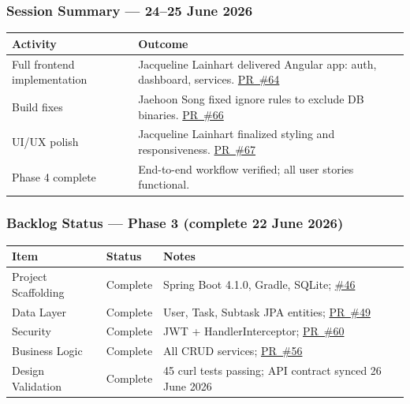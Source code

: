 \subsubsection{Session Summary --- 24--25 June 2026}
\begin{tabularx}{\textwidth}{@{} l X @{}}
  \toprule
  \textbf{Activity} & \textbf{Outcome} \\
  \midrule
  Full frontend implementation & Jacqueline Lainhart delivered Angular app: auth, dashboard, services.
    \href{https://github.com/JaehoonSong12/PEP-Team02-TheDJs/pull/64}{PR~\#64} \\
  Build fixes & Jaehoon Song fixed ignore rules to exclude DB binaries.
    \href{https://github.com/JaehoonSong12/PEP-Team02-TheDJs/pull/66}{PR~\#66} \\
  UI/UX polish & Jacqueline Lainhart finalized styling and responsiveness.
    \href{https://github.com/JaehoonSong12/PEP-Team02-TheDJs/pull/67}{PR~\#67} \\
  Phase 4 complete & End-to-end workflow verified; all user stories functional. \\
  \bottomrule
\end{tabularx}

\subsubsection{Backlog Status --- Phase 3 (complete 22 June 2026)}
\begin{tabularx}{\textwidth}{@{} l l X @{}}
  \toprule
  \textbf{Item} & \textbf{Status} & \textbf{Notes} \\
  \midrule
  Project Scaffolding & Complete & Spring Boot 4.1.0, Gradle, SQLite; \href{https://github.com/JaehoonSong12/PEP-Team02-TheDJs/issues/46}{\#46} \\
  Data Layer          & Complete & User, Task, Subtask JPA entities; \href{https://github.com/JaehoonSong12/PEP-Team02-TheDJs/pull/49}{PR~\#49} \\
  Security            & Complete & JWT + HandlerInterceptor; \href{https://github.com/JaehoonSong12/PEP-Team02-TheDJs/pull/60}{PR~\#60} \\
  Business Logic      & Complete & All CRUD services; \href{https://github.com/JaehoonSong12/PEP-Team02-TheDJs/pull/56}{PR~\#56} \\
  Design Validation   & Complete & 45 curl tests passing; API contract synced 26 June 2026 \\
  \bottomrule
\end{tabularx}


